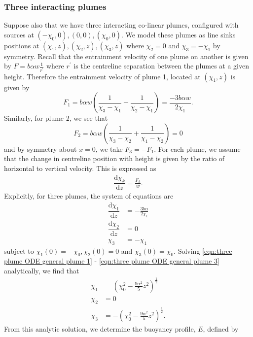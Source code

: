 \documentclass{jfm}
\newcommand{\dbyd}[2]{\dfrac{\mathrm{d} #1}{\mathrm{d}#2}} %
\begin{document}
	\subsubsection{Three interacting plumes}
	Suppose also that we have three interacting co-linear plumes, configured with sources at $(-\chi_0,0),(0,0),(\chi_0,0)$. We model these plumes as line sinks positions at $(\chi_1,z),(\chi_2,z),(\chi_3,z)$ where $\chi_2 = 0$ and $\chi_3 = -\chi_1$ by symmetry.
	Recall that the entrainment velocity of one plume on another is given by $F = b\alpha w \tfrac{1}{r^{\prime}}$ where $r^{\prime}$ is the centreline separation between the plumes at a given height. Therefore the entrainment velocity of plume 1, located at $(\chi_1,z)$ is given by
	\begin{equation}
		F_1 = b\alpha w\left(\frac{1}{\chi_3 - \chi_1} + \frac{1}{\chi_2 - \chi_1}\right) = \frac{-3b\alpha w}{2\chi_1}.
	\end{equation}
	Similarly, for plume 2, we see that
	\begin{equation}
		F_2 = b\alpha w \left(\frac{1}{\chi_3 - \chi_2} + \frac{1}{\chi_1 - \chi_2}\right) = 0
	\end{equation}
	and by symmetry about $x = 0$, we take $F_3 = -F_1$. For each plume, we assume that the change in centreline position with height is given by the ratio of horizontal to vertical velocity. This is expressed as
		\begin{eqnarray}
	\dbyd{\chi_k}{z} = \frac{F_k}{w}.
	\end{eqnarray}
	Explicitly, for three plumes, the system of equations are
	\begin{align}
	\dbyd{\chi_1}{z} &= -\frac{3b\alpha}{2\chi_1} \label{eqn:three plume ODE general plume 1}\\
	\dbyd{\chi_2}{z} &= 0 \label{eqn:three plume ODE general plume 2}\\
	\chi_3 &= -\chi_1 \label{eqn:three plume ODE general plume 3}
	\end{align}
	subject to $\chi_1(0) = -\chi_0, \chi_2(0) = 0$ and $\chi_3(0) = \chi_0$. Solving \eqref{eqn:three plume ODE general plume 1} - \eqref{eqn:three plume ODE general plume 3} analytically, we find that
	\begin{align}
	\chi_1 &= \left(\chi_0^2 - \frac{9\alpha^2}{5}z^2\right)^{\frac{1}{2}}\\
	\chi_2 &= 0 \\
	\chi_3 &= -\left(\chi_0^2 - \frac{9\alpha^2}{5}z^2\right)^{\frac{1}{2}}.
	\end{align}
	From this analytic solution, we determine the buoyancy profile, $E$, defined by
\end{document}
